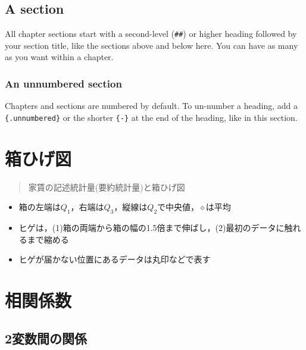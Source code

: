 \documentclass[
]{book}
\providecommand{\tightlist}{%
  \setlength{\itemsep}{0pt}\setlength{\parskip}{0pt}}
\theoremstyle{definition}
\theoremstyle{definition}
\theoremstyle{definition}
\theoremstyle{definition}
\theoremstyle{remark}
\begin{document}
\hypertarget{a-section}{%
\section{A section}\label{a-section}}

All chapter sections start with a second-level (\texttt{\#\#}) or higher heading followed by your section title, like the sections above and below here. You can have as many as you want within a chapter.

\hypertarget{an-unnumbered-section}{%
\subsection*{An unnumbered section}\label{an-unnumbered-section}}

Chapters and sections are numbered by default. To un-number a heading, add a \texttt{\{.unnumbered\}} or the shorter \texttt{\{-\}} at the end of the heading, like in this section.

\hypertarget{ux7bb1ux3072ux3052ux56f3}{%
\chapter{箱ひげ図}\label{ux7bb1ux3072ux3052ux56f3}}

\begin{quote}
家賃の記述統計量(要約統計量)と箱ひげ図
\end{quote}

\begin{itemize}
\tightlist
\item
  箱の左端は\(Q_1\)，右端は\(Q_3\)，縦線は\(Q_2\)で中央値，\(\diamond\)は平均
\item
  ヒゲは，(1)箱の両端から箱の幅の1.5倍まで伸ばし，(2)最初のデータに触れるまで縮める
\item
  ヒゲが届かない位置にあるデータは丸印などで表す
\end{itemize}

\hypertarget{ux76f8ux95a2ux4fc2ux6570}{%
\chapter{相関係数}\label{ux76f8ux95a2ux4fc2ux6570}}

\hypertarget{ux5909ux6570ux9593ux306eux95a2ux4fc2}{%
\section{2変数間の関係}\label{ux5909ux6570ux9593ux306eux95a2ux4fc2}}
\end{document}
